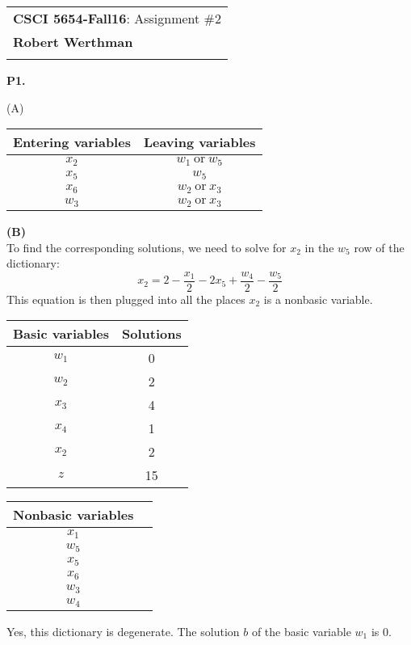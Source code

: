 \documentclass[11pt]{article}
\begin{document}
\begin{tabular}{l}
\textbf{CSCI 5654-Fall16}: Assignment \#2 \\

\textbf{Robert Werthman} \phantom{Supercalifragilisticexpialidocius Smith}\\
\hline
\\[10pt]
\end{tabular}

\noindent
\textbf{P1.}


\noindent (A)
\begin{center}
\begin{tabular}{|c|c|}
\hline
Entering variables & Leaving variables\\
\hline
$x_2$ & $w_1\ \text{or}\ w_5$ \\
\hline
$x_5$ & $w_5$\\
\hline
$x_6$ & $w_2\ \text{or}\ x_3$\\
\hline
$w_3$ & $w_2\ \text{or}\ x_3$\\
\hline
\end{tabular}
\end{center}

\medskip

\noindent\textbf{(B)}\\ 
To find the corresponding solutions, we need to solve for $x_2$ in the $w_5$ row of the dictionary:
$$
x_2 = 2 - \frac{x_1}{2} - 2x_5 + \frac{w_4}{2} - \frac{w_5}{2}
$$
This equation is then plugged into all the places $x_2$ is a nonbasic variable.
\begin{center}
\begin{tabular}{|c|c|}
\hline
Basic variables & Solutions\\
\hline
$w_1$ & 0\\ \hline
$w_2$ & 2\\ \hline
$x_3$ & 4\\ \hline
$x_4$ & 1\\ \hline
$x_2$ & 2\\ \hline
$z$ & 15\\ \hline
\end{tabular}
\hspace{1cm}
\begin{tabular}{|c|c|}
\hline
Nonbasic variables\\
\hline
$x_1$\\ \hline
$w_5$\\ \hline
$x_5$\\ \hline
$x_6$\\ \hline
$w_3$\\ \hline
$w_4$\\ \hline
\end{tabular}
\end{center}
Yes, this dictionary is degenerate.  The solution $b$ of the basic variable $w_1$ is 0.
\medskip
\end{document}

